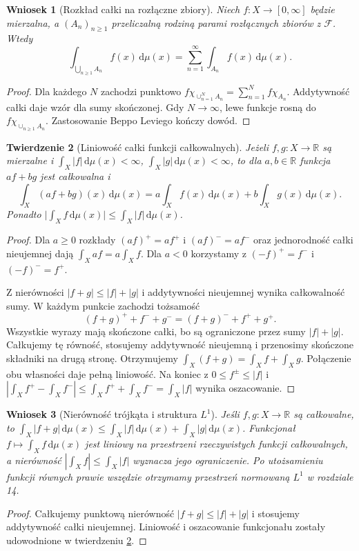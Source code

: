 \documentclass[11pt,a4paper,oneside]{book}
\numberwithin{equation}{chapter}
\theoremstyle{plain}
\newtheorem{twierdzenie}{Twierdzenie}[chapter]
\newtheorem{wniosek}[twierdzenie]{Wniosek}
\theoremstyle{definition}
\theoremstyle{remark}
\begin{document}
\begin{wniosek}[Rozkład całki na rozłączne zbiory]
\label{cor:integral-countable-partition}
Niech $f:X\to[0,\infty]$ będzie mierzalna, a
$(A_n)_{n\ge1}$ przeliczalną rodziną parami rozłącznych
zbiorów z $\mathcal F$. Wtedy
\begin{equation}\label{eq:integral-partition}
\int_{\bigcup_{n\ge1}A_n}f(x)\,\mathrm d\mu(x)
=\sum_{n=1}^{\infty}\int_{A_n}f(x)\,\mathrm d\mu(x).
\end{equation}
\end{wniosek}
\begin{proof}
Dla każdego $N$ zachodzi punktowo
$f\chi_{\cup_{n=1}^NA_n}=
\sum_{n=1}^Nf\chi_{A_n}$.
Addytywność całki daje wzór dla sumy skończonej.
Gdy $N\to\infty$, lewe funkcje rosną do
$f\chi_{\cup_{n\ge1}A_n}$. Zastosowanie
Beppo Leviego kończy dowód.
\end{proof}

\begin{twierdzenie}[Liniowość całki funkcji całkowalnych]
\label{thm:integral-linear-real}
Jeżeli $f,g:X\to\mathbb R$ są mierzalne i
$\int_X|f|\,\mathrm d\mu(x)<\infty$,
$\int_X|g|\,\mathrm d\mu(x)<\infty$, to dla
$a,b\in\mathbb R$ funkcja $af+bg$ jest całkowalna i
\[
\int_X(af+bg)(x)\,\mathrm d\mu(x)
=a\int_Xf(x)\,\mathrm d\mu(x)+
b\int_Xg(x)\,\mathrm d\mu(x).
\]
Ponadto $\bigl|\int_Xf\,\mathrm d\mu(x)\bigr|
\le\int_X|f|\,\mathrm d\mu(x)$.
\end{twierdzenie}
\begin{proof}
Dla $a\ge0$ rozkłady $(af)^+=af^+$ i
$(af)^-=af^-$ oraz jednorodność całki nieujemnej
dają $\int_X af=a\int_X f$. Dla $a<0$ korzystamy z
$(-f)^+=f^-$ i $(-f)^-=f^+$.

Z nierówności $|f+g|\le|f|+|g|$ i addytywności
nieujemnej wynika całkowalność sumy.
W każdym punkcie zachodzi tożsamość
\[
(f+g)^++f^-+g^-=(f+g)^-+f^++g^+.
\]
Wszystkie wyrazy mają skończone całki, bo są
ograniczone przez sumy $|f|+|g|$.
Całkujemy tę równość, stosujemy addytywność
nieujemną i przenosimy skończone składniki na
drugą stronę. Otrzymujemy
$\int_X(f+g)=\int_X f+\int_X g$.
Połączenie obu własności daje pełną liniowość.
Na koniec z $0\le f^\pm\le|f|$ i
$|\int_X f^+-\int_X f^-|\le\int_X f^++\int_X f^-
=\int_X|f|$ wynika oszacowanie.
\end{proof}

\begin{wniosek}[Nierówność trójkąta i struktura $L^1$]
\label{cor:integral-triangle}
Jeśli $f,g:X\to\mathbb R$ są całkowalne, to
$\int_X|f+g|\,\mathrm d\mu(x)\le
\int_X|f|\,\mathrm d\mu(x)+
\int_X|g|\,\mathrm d\mu(x)$.
Funkcjonał $f\mapsto\int_Xf\,\mathrm d\mu(x)$
jest liniowy na przestrzeni rzeczywistych
funkcji całkowalnych, a nierówność
$|\int_X f|\le\int_X|f|$ wyznacza jego ograniczenie.
Po utożsamieniu funkcji równych prawie wszędzie
otrzymamy przestrzeń normowaną $L^1$ w rozdziale 14.
\end{wniosek}
\begin{proof}
Całkujemy punktową nierówność $|f+g|\le|f|+|g|$
i stosujemy addytywność całki nieujemnej. Liniowość
i oszacowanie funkcjonału zostały udowodnione
w twierdzeniu \ref{thm:integral-linear-real}.
\end{proof}
\end{document}
